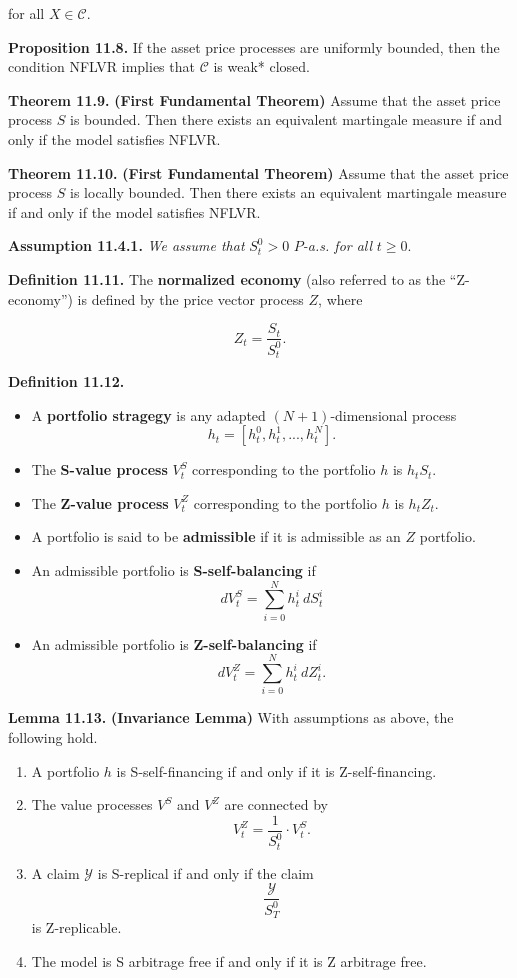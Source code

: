 \documentclass[
]{article}
\providecommand{\tightlist}{%
  \setlength{\itemsep}{0pt}\setlength{\parskip}{0pt}}
\begin{document}
for all \(X\in\mathcal{C}\).

\textbf{Proposition 11.8.} If the asset price processes are uniformly
bounded, then the condition NFLVR implies that \(\mathcal{C}\) is weak*
closed.

\textbf{Theorem 11.9.} \textbf{(First Fundamental Theorem)} Assume that
the asset price process \(S\) is bounded. Then there exists an
equivalent martingale measure if and only if the model satisfies NFLVR.

\textbf{Theorem 11.10.} \textbf{(First Fundamental Theorem)} Assume that
the asset price process \(S\) is locally bounded. Then there exists an
equivalent martingale measure if and only if the model satisfies NFLVR.

\textbf{Assumption 11.4.1.} \emph{We assume that }\(S_t^0>0\)
\(P\)\emph{-a.s. for all }\(t\ge 0\).

\textbf{Definition 11.11.} The \textbf{normalized economy} (also
referred to as the ``Z-economy'') is defined by the price vector process
\(Z\), where

\[
Z_t=\frac{S_t}{S_t^0}.
\]

\textbf{Definition 11.12.}

\begin{itemize}
\tightlist
\item
  A \textbf{portfolio stragegy} is any adapted \((N+1)\)-dimensional
  process \[
    h_t=[h_t^0,h_t^1,...,h_t^N].
    \]
\item
  The \textbf{S-value process} \(V_t^S\) corresponding to the portfolio
  \(h\) is \(h_tS_t\).
\item
  The \textbf{Z-value process} \(V_t^Z\) corresponding to the portfolio
  \(h\) is \(h_tZ_t\).
\item
  A portfolio is said to be \textbf{admissible} if it is admissible as
  an \(Z\) portfolio.
\item
  An admissible portfolio is \textbf{S-self-balancing} if \[
    dV_t^S=\sum_{i=0}^Nh_t^i\ dS_t^i
    \]
\item
  An admissible portfolio is \textbf{Z-self-balancing} if \[
    dV_t^Z=\sum_{i=0}^Nh_t^i\ dZ_t^i.
    \]
\end{itemize}

\textbf{Lemma 11.13.} \textbf{(Invariance Lemma)} With assumptions as
above, the following hold.

\begin{enumerate}
\def\labelenumi{\roman{enumi}.}
\tightlist
\item
  A portfolio \(h\) is S-self-financing if and only if it is
  Z-self-financing.
\item
  The value processes \(V^S\) and \(V^Z\) are connected by \[
    V_t^Z=\frac{1}{S_t^0}\cdot V_t^S.
    \]
\item
  A claim \(\mathcal{Y}\) is S-replical if and only if the claim \[
    \frac{\mathcal{Y}}{S_T^0}
    \] is Z-replicable.
\item
  The model is S arbitrage free if and only if it is Z arbitrage free.
\end{enumerate}
\end{document}
